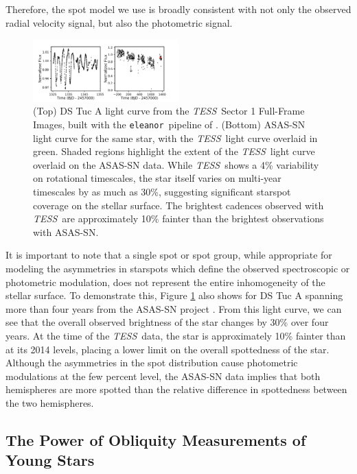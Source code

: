 \documentclass[twocolumn]{aastex63}
\newcommand{\tess}{{\it TESS}}
\newcommand{\eleanor}{\texttt{eleanor}}
\begin{document}
Therefore, the spot model we use is broadly consistent with not only the observed radial velocity signal, but also the photometric signal.


\begin{figure}[!tbh]
  \begin{center}
    \includegraphics[width=0.5\textwidth, trim={0cm 0.0cm 0cm 0cm}, clip=true]{../figures/lcs.pdf}
   \end{center}
  \caption{(Top) DS Tuc A light curve from the \tess\ Sector 1 Full-Frame Images, built with the \eleanor\ pipeline of \citet{Feinstein19}. (Bottom) ASAS-SN light curve for the same star, with the \tess\ light curve overlaid in green. Shaded regions highlight the extent of the \tess\ light curve overlaid on the ASAS-SN data. While \tess\ shows a 4\% variability on rotational timescales, the star itself varies on multi-year timescales by as much as 30\%, suggesting significant starspot coverage on the stellar surface. The brightest cadences observed with \tess\ are approximately 10\% fainter than the brightest observations with ASAS-SN.}
  \label{fig:lc_data}
\end{figure}

It is important to note that a single spot or spot group, while appropriate for modeling the asymmetries in starspots which define the observed spectroscopic or photometric modulation, does not represent the entire inhomogeneity of the stellar surface. 
To demonstrate this, Figure \ref{fig:lc_data} also shows for DS Tuc A spanning more than four years from the ASAS-SN project \citep{Shappee14, Kochanek17}.
From this light curve, we can see that the overall observed brightness of the star changes by 30\% over four years. 
At the time of the \tess\ data, the star is approximately 10\% fainter than at its 2014 levels, placing a lower limit on the overall spottedness of the star. 
Although the asymmetries in the spot distribution cause photometric modulations at the few percent level, the ASAS-SN data implies that both hemispheres are more spotted than the relative difference in spottedness between the two hemispheres.


\subsection{The Power of Obliquity Measurements of Young Stars}
\end{document}
